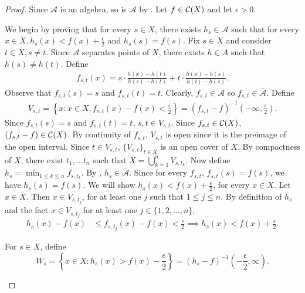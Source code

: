 \begin{proof}
Since $\mathcal{A}$ is an algebra, so is $\overline{\mathcal{A}}$ by .
Let $f \in {\mathcal C}(X)$ and let $\epsilon > 0$.
\setcounter{step}{0}
\begin{step}
We begin by proving that for every $s \in X$, there exists $h_s \in \overline{\mathcal{A}}$ such that for every $x \in X, h_s(x) < f(x) + \frac{\epsilon}{2}$ and $h_s(s) = f(s)$. Fix $s \in X$ and consider $t \in X, s \neq t$. Since $\mathcal{A}$ separates points of $X$, there exists $h \in A$ such that $h(s) \neq h(t)$. Define 
\begin{align*}
    f_{s, t} (x) = s \cdot \frac{h(x) - h(t)}{h(s) - h(t)} + t  \cdot \frac{h(x) - h(s)}{h(t) - h(s)}.
\end{align*}
Observe that $f_{s, t} (s) = s$ and $f_{s, t} (t) = t$. Clearly, $f_{s,t} \in \mathcal{A}$ so $f_{s,t} \in  \overline{\mathcal{A}}$. Define
\begin{align*}
    V_{s, t} = \left \{ x :  x \in X, f_{s,t}(x) - f(x) < \frac{\epsilon}{2} \right \} = (f_{s,t} - f)^{-1} \left (-\infty, \frac{\epsilon}{2} \right ).
\end{align*}
Since $f_{s, t} (s) = s$ and $f_{s, t} (t) = t$, $s, t \in V_{s, t}$. Since $f_{s,t} \in {\mathcal C}(X)$, $(f_{s,t} - f) \in {\mathcal C}(X)$. By continuity of $f_{s,t}$, $V_{s, t}$ is open since it is the preimage of the open interval. Since $t \in V_{s,t}$, $\{ V_{s,t} \}_{t \in X}$ is an open cover of $X$. By compactness of $X$, there exist $t_1, \ldots t_n$ such that $X = \bigcup_{k = 1}^{n} V_{s, t_k}$. Now define $h_s = \min_{1 \leq k \leq n} f_{s, t_{k}}$. By , $h_s \in \overline{\mathcal{A}}$. Since for every $f_{s, t}$, $f_{s, t}(s) = f(s)$, we have $h_s(s) = f(s)$. We will show $h_s(x) < f(x) + \frac{\epsilon}{2}$, for every $x \in X$. Let $x \in X$. Then $x \in V_{s, t_j}$, for at least one $j$ such that $1 \leq j \leq n$. By definition of $h_s$ and the fact $x \in V_{s, t_j}$ for at least one $j \in \{ 1, 2, \ldots, n \}$,
\begin{align*}
    h_s(x) - f(x) &\leq f_{s, t_j} (x) - f(x) < \frac{\epsilon}{2} \implies h_s(x) < f(x) + \frac{\epsilon}{2}.
\end{align*}
\end{step}
\begin{step}
For $s \in X$, define \[
    W_s = \left \{ x \in X : h_{s}(x) > f(x) - \frac{\epsilon}{2} \right \} = (h_{s} - f)^{-1} \left (-\frac{\epsilon}{2}, \infty \right).
\]

\end{step}
\end{proof}
